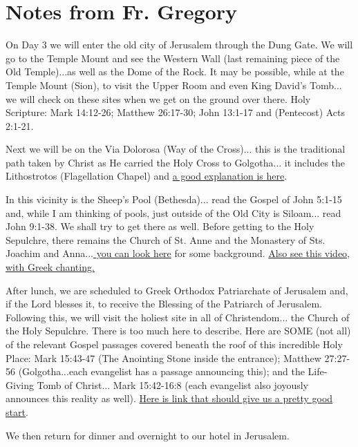 \documentclass[letterpaper]{report}
\begin{document}
\section{Notes from Fr. Gregory}
On Day 3 we will enter the old city of Jerusalem through the Dung Gate.
We will go to the Temple Mount and see the Western Wall
(last remaining piece of the Old Temple)...as well as the Dome of the Rock.
It may be possible, while at the Temple Mount (Sion),
to visit the Upper Room and even King David's Tomb...
we will check on these sites when we get on the ground over there.
Holy Scripture: Mark 14:12-26; Matthew 26:17-30;
John 13:1-17 and (Pentecost) Acts 2:1-21.

Next we will be on the Via Dolorosa (Way of the Cross)...
this is the traditional path taken by Christ as He carried the Holy Cross to
Golgotha...
it includes the Lithostrotos (Flagellation Chapel) and 
\href{http://www.mikemasonbooks.com/the-lithostrotos-chapter-57-of-jesus-his-story-in-stone/}{
	a good explanation is here}.

In this vicinity is the Sheep's Pool (Bethesda)...
read the Gospel of John 5:1-15 and, while I am thinking of pools,
just outside of the Old City is Siloam...
read John 9:1-38. We shall try to get there as well.
Before getting to the Holy Sepulchre,
there remains the Church of St. Anne and the Monastery of Sts. Joachim and
Anna...\href{http://www.seetheholyland.net/church-of-st-anne/}{
	you can look here} for some background.
\href{http://www.johnsanidopoulos.com/2011/09/video-home-of-sts-joachim-and-anna-in.html}{
Also see this video, with Greek chanting.}

After lunch, we are scheduled to Greek Orthodox Patriarchate of Jerusalem and,
if the Lord blesses it, to receive the Blessing of the Patriarch of Jerusalem.
Following this, we will visit the holiest site in all of Christendom...
the Church of the Holy Sepulchre.
There is too much here to describe.
Here are SOME (not all) of the relevant Gospel passages covered beneath the 
roof of this incredible Holy Place:
Mark 15:43-47 (The Anointing Stone inside the entrance);
Matthew 27:27-56 (Golgotha...each evangelist has a passage announcing this); 
and the Life-Giving Tomb of Christ...
Mark 15:42-16:8
(each evangelist also joyously announces this reality as well).
\href{https://orthodoxwiki.org/Church_of_the_Holy_Sepulchre_(Jerusalem)}{
	Here is link that should give us a pretty good start}.

We then return for dinner and overnight to our hotel in Jerusalem.
\end{document}
